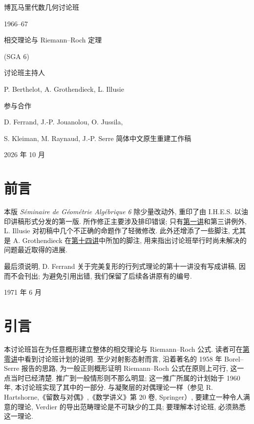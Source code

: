 \begin{titlepage}
\begin{center}
{\Large 博瓦马里代数几何讨论班}\par
{\large 1966--67}\par
\vspace{2em}
{\LARGE 相交理论与 Riemann--Roch 定理}\par
{\large (SGA 6)}\par
\vspace{3em}
讨论班主持人\par
P. Berthelot, A. Grothendieck, L. Illusie\par
\vspace{1em}
参与合作\par
D. Ferrand, J.-P. Jouanolou, O. Jussila,\par
S. Kleiman, M. Raynaud, J.-P. Serre
\vfill
{\large 简体中文原生重建工作稿}\par
2026 年 10 月
\end{center}
\end{titlepage}


\section*{前言}
本版 \emph{Séminaire de Géométrie Algébrique 6} 除少量改动外, 重印了由 I.H.E.S. 以油印讲稿形式分发的第一版. 所作修正主要涉及排印错误; 只有\hyperlink{sga6.e01.expose}{第一讲}和第三讲例外, L. Illusie 对初稿中几个不正确的命题作了轻微修改. 此外还增添了一些脚注, 尤其是 A. Grothendieck 在\hyperlink{sga6.e14.expose}{第十四讲}中所加的脚注, 用来指出讨论班举行时尚未解决的问题最近取得的进展.

最后须说明, D. Ferrand 关于完美复形的行列式理论的第十一讲没有写成讲稿, 因而不会刊出; 为避免引用出错, 我们保留了后续各讲原有的编号.

\begin{flushright}1971 年 6 月\end{flushright}

\section*{引言}
本讨论班旨在为任意概形建立整体的相交理论与 Riemann--Roch 公式. 读者可在\hyperlink{sga6.e00.expose}{第零讲}中看到讨论班计划的说明. 至少对射影态射而言, 沿着著名的 1958 年 Borel--Serre 报告的思路, 为一般正则概形证明 Riemann--Roch 公式在原则上可行, 这一点当时已经清楚. 推广到一般情形则不那么明显; 这一推广所属的计划始于 1960 年, 本讨论班实现了其中的一部分. 与凝聚层的对偶理论一样（参见 R. Hartshorne,《留数与对偶》,《数学讲义》第 20 卷, Springer）, 要建立一种令人满意的理论, Verdier 的导出范畴理论是不可缺少的工具; 要理解本讨论班, 必须熟悉这一理论.

